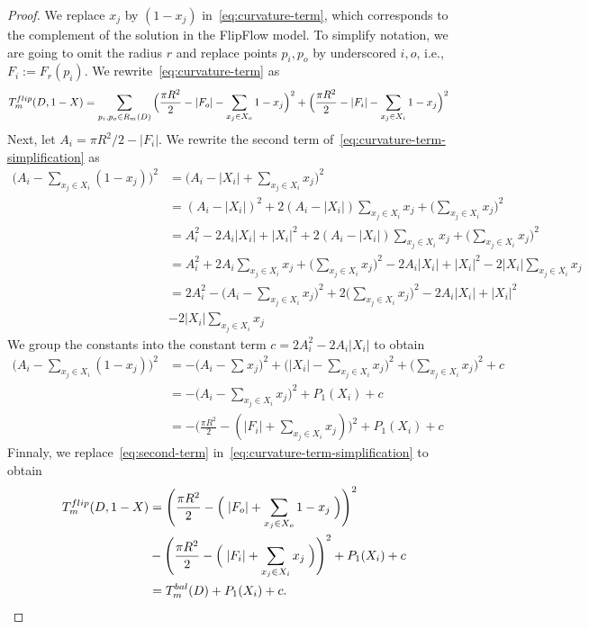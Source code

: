 \begin{proof}

We replace $x_j$ by $(1-x_j)$ in~\cref{eq:curvature-term}, which corresponds to the complement of the solution in the FlipFlow model. To simplify notation, we are going to omit the radius $r$ and replace points $p_i,p_o$ by underscored $i,o$, i.e., $F_i := F_r(p_i)$. We rewrite~\cref{eq:curvature-term} as
\begin{align}
T_{m}^{flip}(D,1-X) &= \sum_{ p_i,p_o \in R_m(D)}{ \Big( \frac{\pi R^2}{2} - |F_o| - \sum_{x_j \in X_o}{1-x_j}\Big)^2 + \Big(\frac{\pi R^2}{2} - |F_i| - \sum_{x_j \in X_i}{1-x_j}\Big)^2 }
\label{eq:curvature-term-simplification}
\end{align}
%
Next, let $A_i = \pi R^2/2 - |F_i|$. We rewrite  the second term of~\cref{eq:curvature-term-simplification} as
\begin{align*}
	\Big(A_i - \sum_{x_j \in X_i}{ (1-x_j) } \Big)^2 &= \Big( A_i - |X_i| + \sum_{x_j \in X_i}{ x_j } \Big)^2 \\
	&= (A_i - |X_i|)^2 + 2(A_i - |X_i|)\sum_{x_j \in X_i}{x_j} + \Big( \sum_{x_j \in X_i}{x_j} \Big)^2\\	
	&= A_i^2 -2A_i|X_i| + |X_i|^2 + 2(A_i - |X_i|)\sum_{x_j \in X_i}{x_j} + \Big( \sum_{x_j \in X_i}{x_j} \Big)^2\\
	&= A_i^2 + 2A_i\sum_{x_j \in X_i}{x_j} + \Big( \sum_{x_j \in X_i}{x_j} \Big)^2 - 2A_i|X_i| + |X_i|^2 -2|X_i|\sum_{x_j \in X_i}{x_j} \\
	&= 2A_i^2 - \Big(A_i - \sum_{x_j \in X_i}{x_j}\Big)^2 + 2\Big( \sum_{x_j \in X_i}{x_j} \Big) ^2 - 2A_i|X_i| + |X_i|^2 \nonumber \\
	& - 2|X_i|\sum_{x_j \in X_i}{x_j}
\end{align*}
%
	We group the constants into the constant term $c=2A_i^2 - 2A_i|X_i|$	 to obtain
\begin{align}
		\Big(A_i - \sum_{x_j \in X_i}{ (1-x_j) }\Big)^2 &= - \Big(A_i - \sum_{}{x_j}\Big)^2 + \Big(|X_i| - \sum_{x_j \in X_i}{x_j}\Big)^2 + \Big(\sum_{x_j \in X_i}{x_j}\Big)^2 + c \nonumber \\
	&= - \Big(A_i - \sum_{x_j \in X_i}{x_j}\Big)^2 + P_1(X_i) + c \nonumber \\
	&= - \Big(\frac{\pi R^2}{2} - (|F_i| + \sum_{x_j \in X_i}{x_j}) \Big)^2 + P_1(X_i) + c \nonumber 	
	\label{eq:second-term}
\end{align}
%
Finnaly, we  replace~\cref{eq:second-term} in~\cref{eq:curvature-term-simplification} to obtain
\begin{align}
T_{m}^{flip}(D,1-X) &= \Bigg( \frac{\pi R^2}{2} - \Big(\; |F_o| + \sum_{ x_j \in X_o}{1-x_j} \; \Big) \Bigg)^2 \nonumber \\
& - \Bigg(\frac{\pi R^2}{2} - \Big(\; |F_i| + \sum_{x_j \in X_i}{x_j}\;\Big) \Bigg)^2  + P_1(X_i) + c \nonumber \\
&= T_{m}^{bal}(D) + P_1(X_i) + c.
\end{align}
%
\end{proof}


